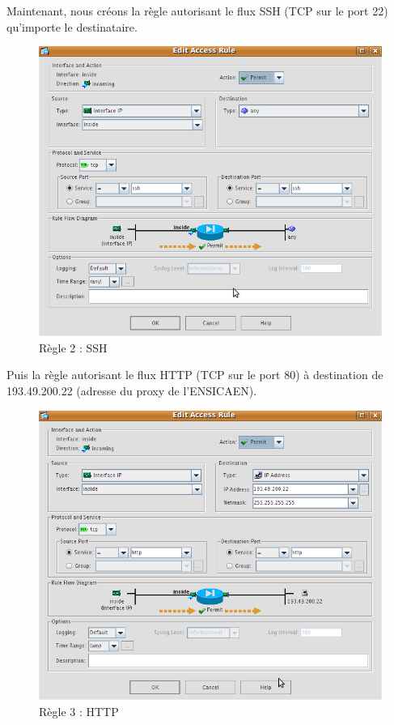 \documentclass[a4paper,12pt]{article}
\begin{document}
\newpage
Maintenant, nous créons la règle autorisant le flux SSH (TCP sur le port 22) qu'importe le destinataire.
\begin{figure}[H]
	\center
	\includegraphics[width=15cm]{img/5-RegleSSH.png}
	\caption{Règle 2 : SSH}
\end{figure}


\newpage
Puis la règle autorisant le flux HTTP (TCP sur le port 80) à destination de 193.49.200.22 (adresse du proxy de l'ENSICAEN).
\begin{figure}[H]
	\center
	\includegraphics[width=15cm]{img/6-RegleHTTP.png}
	\caption{Règle 3 : HTTP}
\end{figure}
\end{document}
